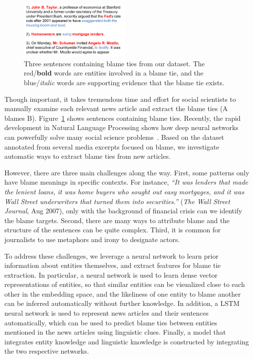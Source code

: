 \documentclass[letterpaper]{article} %
\begin{document}
\begin{figure}[t!]
\centering
\includegraphics[width=0.49\textwidth]{demo}
\caption{Three sentences containing blame ties from our dataset. The red/{\bf bold} words are entities involved in a blame tie, and the blue/{\it italic} words are supporting evidence that the blame tie exists.}
\label{figure:introdemo}
\end{figure}

Though important, it takes tremendous time and effort for social scientists to manually examine each relevant news article and extract the blame ties (A blames B). Figure~\ref{figure:introdemo} shows sentences containing blame ties. Recently, the rapid development in Natural Language Processing shows how deep neural networks can powerfully solve many social science problems~\cite{rule2015lexical,bail2016combining}. Based on the dataset annotated from several media excerpts focused on blame, we investigate automatic ways to extract blame ties from new articles.

However, there are three main challenges along the way. First, some patterns only have blame meanings in specific contexts. For instance, {\it ``It was lenders that made the lenient loans, it was home buyers who sought out easy mortgages, and it was Wall Street underwriters that turned them into securities.''} ({\it The Wall Street Journal}, Aug 2007), only with the background of financial crisis can we identify the blame targets. Second, there are many ways to attribute blame and the structure of the sentences can be quite complex. Third, it is common for journalists to use metaphors and irony to designate actors.

To address these challenges, we leverage a neural network to learn prior information about entities themselves, and extract features for blame tie extraction. In particular, a neural network is used to learn dense vector representations of entities, so that similar entities can be visualized close to each other in the embedding space, and the likeliness of one entity to blame another can be inferred automatically without further knowledge. In addition, a LSTM neural network is used to represent news articles and their sentences automatically, which can be used to predict blame ties between entities mentioned in the news articles using linguistic clues. Finally, a model that integrates entity knowledge and linguistic knowledge is constructed by integrating the two respective networks. 
\end{document}
